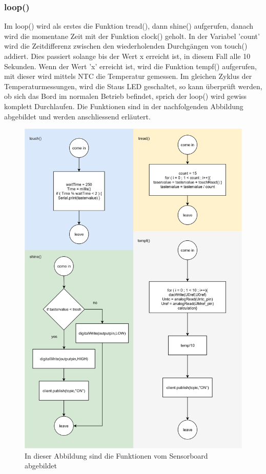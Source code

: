 \subsubsection{loop()} \label{subsubsec: sensorloop}
Im loop() wird als erstes die Funktion tread(), dann shine() aufgerufen, danach wird die momentane Zeit mit der Funktion clock() geholt. In der Variabel 'count' wird die Zeitdifferenz zwischen den wiederholenden Durchgängen von touch() addiert. Dies passiert solange bis der Wert x erreicht ist, in diesem Fall alle 10 Sekunden. Wenn der Wert 'x' erreicht ist, wird die Funktion tempf() aufgerufen, mit dieser wird mittels NTC die Temperatur gemessen. Im gleichen Zyklus der Temperaturmessungen, wird die Staus LED geschaltet, so kann überprüft werden, ob sich das Bord im normalen Betrieb befindet, sprich der loop() wird gewiss komplett Durchlaufen. Die Funktionen sind in der nachfolgenden Abbildung abgebildet und werden anschliessend erläutert.

\begin{figure}[H]
	\centering
	\includegraphics[width=\textwidth]{graphics/FunktionenSensor.png}
	\caption{In dieser Abbildung sind die Funktionen vom Sensorboard abgebildet}
	\label{pic: funktionen sensor}
\end{figure}   
